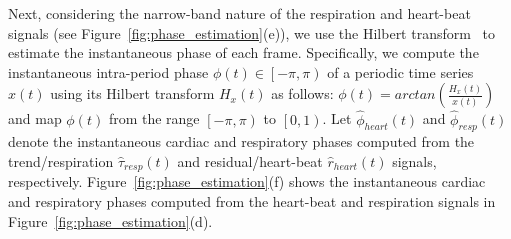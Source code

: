 \documentclass[runningheads,a4paper]{llncs}
\begin{document}
	Next, considering the narrow-band nature of the respiration and heart-beat signals (see  Figure~\ref{fig:phase_estimation}(e)), we use the Hilbert transform~\cite{Lu2013} to estimate the instantaneous phase of each frame. Specifically, we compute the instantaneous intra-period phase $\phi(t) \in \left [  -\pi, \pi\right )$ of a periodic time series $x(t)$ using its Hilbert transform $H_x(t)$ as follows: $\phi(t) = arctan \left( \frac{H_x(t)}{x(t)}\right)$ and map $\phi(t)$ from the range $\left [  -\pi, \pi\right )$ to $\left [  0, 1\right )$. Let $\hat{\phi}_{heart}(t)$ and $\hat{\phi}_{resp}(t)$ denote the instantaneous cardiac and respiratory phases computed from the trend/respiration $\hat{\tau}_{resp}(t)$ and residual/heart-beat $\hat{r}_{heart}(t)$ signals, respectively. Figure~\ref{fig:phase_estimation}(f) shows the instantaneous cardiac and respiratory phases computed from the heart-beat and respiration signals in Figure~\ref{fig:phase_estimation}(d). 
%
\vspace{-0.5cm}
\end{document}
